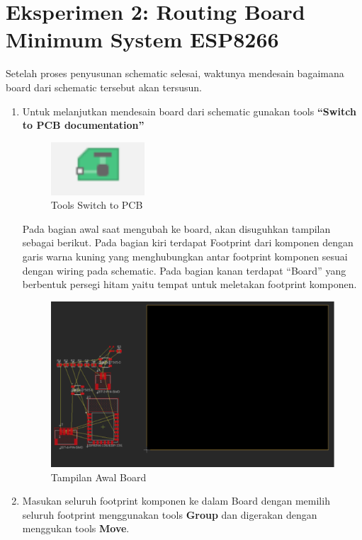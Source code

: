 \section{Eksperimen 2: Routing Board Minimum System ESP8266}
Setelah proses penyusunan schematic selesai, waktunya mendesain bagaimana board
dari schematic tersebut akan tersusun.
\begin{enumerate}
    \item Untuk melanjutkan mendesain board dari schematic gunakan tools \textbf{“Switch to PCB
    documentation”}
    \begin{figure}[H]
        \centering
        \includegraphics[width=0.4\linewidth]{P1/img/switchtopcb.png}
        \caption{Tools Switch to PCB} 
        \label{fig:toolsswitchtopcb}
    \end{figure}
    Pada bagian awal saat mengubah ke board, akan disuguhkan tampilan sebagai berikut. Pada
    bagian kiri terdapat Footprint dari komponen dengan garis warna kuning yang
    menghubungkan antar footprint komponen sesuai dengan wiring pada schematic. Pada
    bagian kanan terdapat “Board” yang berbentuk persegi hitam yaitu tempat untuk meletakan
    footprint komponen.
    \begin{figure}[H]
        \centering
        \includegraphics[width=0.9\linewidth]{P1/img/PCBawal.png}
        \caption{Tampilan Awal Board} 
        \label{fig:tampilanawalboard}
    \end{figure}
    \vspace{-\topsep}
    \item Masukan seluruh footprint komponen ke dalam Board dengan memilih seluruh footprint menggunakan tools \textbf{Group} dan digerakan dengan menggukan tools \textbf{Move}.

\end{enumerate}
